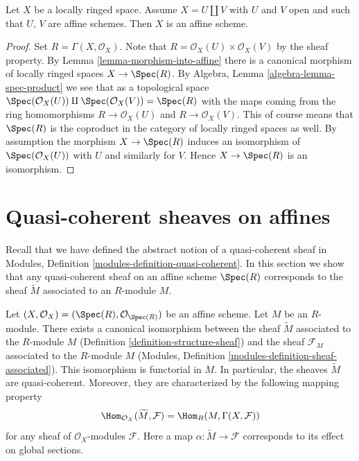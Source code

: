 \begin{lemma}
\label{lemma-disjoint-union-affines}
Let $X$ be a locally ringed space.
Assume $X = U \amalg V$ with $U$ and $V$ open and
such that $U$, $V$ are affine schemes. Then $X$ is an affine scheme.
\end{lemma}

\begin{proof}
Set $R = \Gamma(X, \mathcal{O}_X)$.
Note that $R = \mathcal{O}_X(U) \times \mathcal{O}_X(V)$
by the sheaf property. By Lemma \ref{lemma-morphism-into-affine}
there is a canonical morphism of locally ringed spaces
$X \to \Spec(R)$. By Algebra, Lemma \ref{algebra-lemma-spec-product}
we see that as a topological space
$\Spec(\mathcal{O}_X(U)) \amalg \Spec(\mathcal{O}_X(V)) =
\Spec(R)$
with the maps coming from the ring homomorphisms
$R \to \mathcal{O}_X(U)$ and $R \to \mathcal{O}_X(V)$.
This of course means that $\Spec(R)$ is the coproduct
in the category of locally ringed spaces as well.
By assumption the morphism $X \to \Spec(R)$ induces an isomorphism
of $\Spec(\mathcal{O}_X(U))$ with $U$ and similarly
for $V$. Hence $X \to \Spec(R)$ is an isomorphism.
\end{proof}















\section{Quasi-coherent sheaves on affines}
\label{section-quasi-coherent-affine}

\noindent
Recall that we have defined the abstract notion of a quasi-coherent
sheaf in Modules, Definition \ref{modules-definition-quasi-coherent}.
In this section we show that any quasi-coherent sheaf on an affine
scheme $\Spec(R)$ corresponds to the sheaf $\widetilde M$ associated to
an $R$-module $M$.

\begin{lemma}
\label{lemma-compare-constructions}
Let $(X, \mathcal{O}_X) = (\Spec(R), \mathcal{O}_{\Spec(R)})$
be an affine scheme. Let $M$ be an $R$-module. There exists a canonical
isomorphism between the sheaf $\widetilde M$ associated to the $R$-module
$M$ (Definition \ref{definition-structure-sheaf}) and the sheaf
$\mathcal{F}_M$ associated to the $R$-module $M$
(Modules, Definition \ref{modules-definition-sheaf-associated}).
This isomorphism is functorial in $M$. In particular,
the sheaves $\widetilde M$ are quasi-coherent. Moreover, they
are characterized by the following mapping property
$$
\Hom_{\mathcal{O}_X}(\widetilde M, \mathcal{F})
=
\Hom_R(M, \Gamma(X, \mathcal{F}))
$$
for any sheaf of $\mathcal{O}_X$-modules $\mathcal{F}$.
Here a map $\alpha : \widetilde M \to \mathcal{F}$ corresponds
to its effect on global sections.
\end{lemma}

